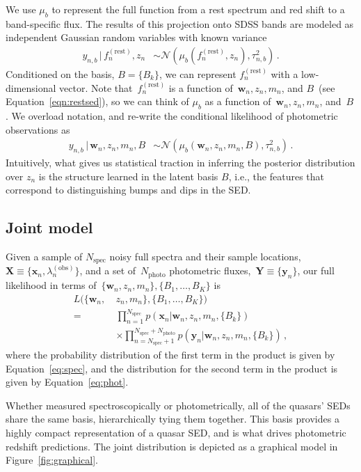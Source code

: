 \documentclass{article}
\newcommand{\Nspec}{{N_{\text{spec}}}}
\newcommand{\Nphoto}{{N_{\text{photo}}}}
\begin{document}
 We use $\mu_b$ to represent the full function from a rest spectrum and red shift to a band-specific flux.
 The results of this projection onto SDSS bands are modeled as independent Gaussian random variables with known variance
\begin{align}
  y_{n,b}\, |\, f_n^{(\text{rest})}, z_n &\sim \mathcal{N}( \mu_b(f_n^{(\text{rest})}, z_n), \tau^2_{n,b} ) \, .
\end{align}
Conditioned on the basis, ${B = \{B_k\}}$, we can represent $f_n^{(\text{rest})}$ with a low-dimensional vector.
Note that~$f_n^{(\text{rest})}$ is a function of~${\mathbf{w}_n, z_n, m_n}$, and $B$~(see Equation~\ref{eqn:restsed}), so we can think of $\mu_b$ as a function of~${\mathbf{w}_n, z_n, m_n}$, and~$B$.
We overload notation, and re-write the conditional likelihood of photometric observations as
\begin{align}
    y_{n,b} \,|\, \mathbf{w}_n, z_n, m_n, B &\sim \mathcal{N}( \mu_b(\mathbf{w}_n, z_n, m_n, B), \tau^2_{n,b} ) \, .
   \label{eq:phot}
\end{align}
Intuitively, what gives us statistical traction in inferring the posterior distribution over $z_n$ is the structure learned in the latent basis $B$, i.e., the features that correspond to distinguishing bumps and dips in the SED.

\subsection{Joint model}
Given a sample of $\Nspec$ noisy full spectra and their sample locations, ${\mathbf{X} \equiv \{\mathbf{x}_n, \lambda^{(\text{obs})}_n \}}$, and a set of~$\Nphoto$ photometric fluxes,~${\mathbf{Y} \equiv \{\mathbf{y}_n\}}$, our full likelihood in terms of~$\{ \mathbf{w}_n, z_n, m_n \}, \{ B_1, \dots, B_K \}$ is 
\begin{align*}
  L( \{ \mathbf{w}_n, ~&z_n, m_n \}, \{ B_1, \dots, B_K \} )  \\
    = & \prod_{n=1}^\Nspec p( \mathbf{x}_n | \mathbf{w}_n, z_n, m_n, \{ B_k \})  \\
      & \times \prod_{n=\Nspec+1}^{\Nspec + \Nphoto} p( \mathbf{y}_n | \mathbf{w}_n, z_n, m_n, \{ B_k \})\,,
\end{align*}
where the probability distribution of the first term in the product is given by Equation~\ref{eq:spec}, and the distribution for the second term in the product is given by Equation~\ref{eq:phot}.  

Whether measured spectroscopically or photometrically, all of the quasars' SEDs share the same basis, hierarchically tying them together.
This basis provides a highly compact representation of a quasar SED, and is what drives photometric redshift predictions.  
The joint distribution is depicted as a graphical model in Figure~\ref{fig:graphical}.
\end{document}
